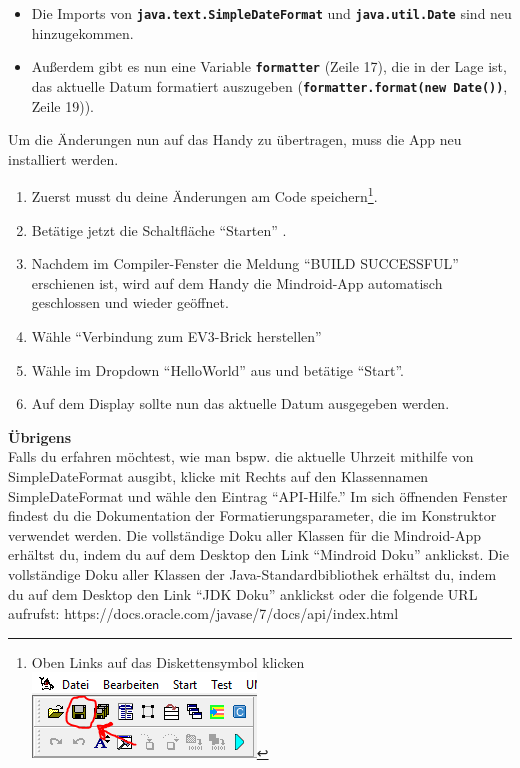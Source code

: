 \documentclass[
	12pt,
	article,
	type=bsc, %
	colorbacktitle,
	instlogo,
	accentcolor=tud1c,
	draft,
	german,
	twoside
]{tudexercise}
\newcommand{\solpath}[0]{../../impl/androidApp/app/src/main/java/org/mindroid/android/app/programs/workshop/solutions}
\newcommand{\bfcode}[1]{\texttt{\textbf{#1}}}
\begin{document}
		
		\begin{itemize}
		\item Die Imports von \bfcode{java.text.SimpleDateFormat} und \bfcode{java.util.Date} sind neu hinzugekommen.
		\item Außerdem gibt es nun eine Variable \bfcode{formatter} (Zeile 17), die in der Lage ist, das aktuelle Datum formatiert auszugeben (\bfcode{formatter.format(new Date())}, Zeile 19)).
		\end{itemize}
		Um die Änderungen nun auf das Handy zu übertragen, muss die App neu installiert werden.
		\begin{enumerate}
		\item Zuerst musst du deine Änderungen am Code 
		 speichern\footnote{Oben Links auf das Diskettensymbol klicken \includegraphics[]{img/je_savebutton}}. 
		\item Betätige jetzt die Schaltfläche “Starten” .
		\item Nachdem im Compiler-Fenster die Meldung “BUILD SUCCESSFUL” erschienen ist, wird auf dem Handy die Mindroid-App automatisch geschlossen und wieder geöffnet.
		\item Wähle “Verbindung zum EV3-Brick herstellen”
		\item Wähle im Dropdown “HelloWorld” aus und betätige “Start”.
		\item Auf dem Display sollte nun das aktuelle Datum ausgegeben werden.
		
		\end{enumerate}
		
	\textbf{Übrigens}\\
		
	Falls du erfahren möchtest, wie man bspw. die aktuelle Uhrzeit mithilfe von SimpleDateFormat ausgibt, klicke mit Rechts auf den Klassennamen SimpleDateFormat und wähle den Eintrag “API-Hilfe.” Im sich öffnenden Fenster findest du die Dokumentation der Formatierungsparameter, die im Konstruktor verwendet werden.
	Die vollständige Doku aller Klassen für die Mindroid-App erhältst du, indem du auf dem Desktop den Link “Mindroid Doku” anklickst.
	Die vollständige Doku aller Klassen der Java-Standardbibliothek erhältst du, indem du auf dem Desktop den Link “JDK Doku” anklickst oder die folgende URL aufrufst: https://docs.oracle.com/javase/7/docs/api/index.html 
	
\end{document}
